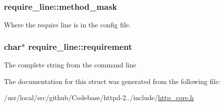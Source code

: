 \subsubsection[{\texorpdfstring{method\+\_\+mask}{method_mask}}]{ require\+\_\+line\+::method\+\_\+mask}\hypertarget{structrequire__line_a4b0b9f44cdb71b3aaab7bcea2d3b33c5}{}\label{structrequire__line_a4b0b9f44cdb71b3aaab7bcea2d3b33c5}
Where the require line is in the config file. 
\subsubsection[{\texorpdfstring{requirement}{requirement}}]{\setlength{\rightskip}{0pt plus 5cm}char$\ast$ require\+\_\+line\+::requirement}\hypertarget{structrequire__line_a147f21edbd0e2b8af2136b9f9e9054ea}{}\label{structrequire__line_a147f21edbd0e2b8af2136b9f9e9054ea}
The complete string from the command line 

The documentation for this struct was generated from the following file\+:\begin{DoxyCompactItemize}
\item 
/usr/local/src/github/\+Codebase/httpd-\/2../include/\hyperlink{http__core_8h}{http\+\_\+core.\+h}\end{DoxyCompactItemize}
